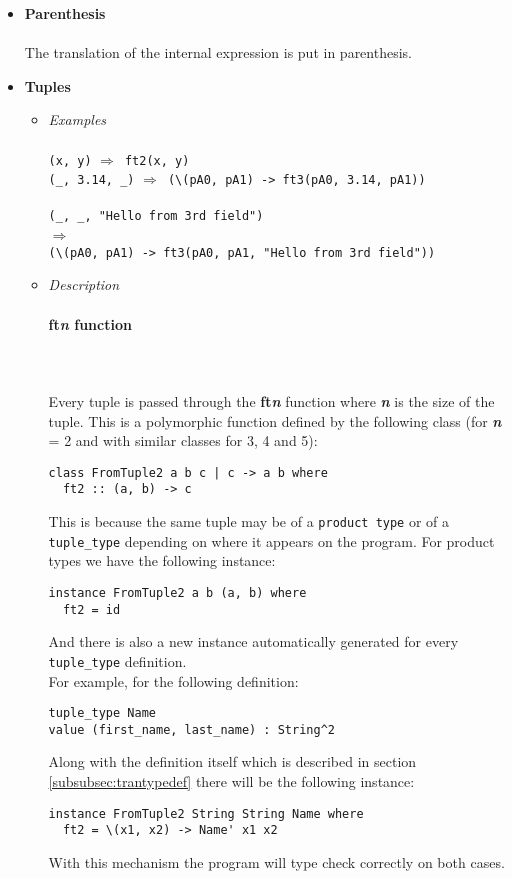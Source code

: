 \documentclass[diploma]{softlab-thesis}
\def\lra{$\Longrightarrow$\ }
\def\pend{\mbox{}\\\\}
\begin{document}
\begin{itemize}
\item
\textbf{Parenthesis}\\\\
The translation of the internal expression is put in parenthesis.\\

\item
\textbf{Tuples}
\begin{itemize}
\item
\textit{Examples}\\\\
\texttt{(x, y)} \lra \texttt{ft2(x, y)} \\
\verb|(_, 3.14, _)| \lra \verb|(\(pA0, pA1) -> ft3(pA0, 3.14, pA1))|\\
\\
\verb|(_, _, "Hello from 3rd field")|
\\
\lra
\\
\verb|(\(pA0, pA1) -> ft3(pA0, pA1, "Hello from 3rd field"))|\\

\newpage
\item
\textit{Description}
\paragraph{ft\textit{n} function}\pend
Every tuple is passed through the \textbf{ft\textit{n}} function where
\textbf{\textit{n}} is the size of the tuple. This is a polymorphic function
defined by the following class (for \textbf{\textit{n}} = 2 and with similar
classes for 3, 4 and 5):
\begin{verbatim}
class FromTuple2 a b c | c -> a b where
  ft2 :: (a, b) -> c
\end{verbatim}
This is because the same tuple may be of a \texttt{product type} or of a
\verb|tuple_type| depending on where it appears on the program.
For product types we have the following instance:
\begin{verbatim}
instance FromTuple2 a b (a, b) where
  ft2 = id
\end{verbatim}
And there is also a new instance automatically generated for every
\verb|tuple_type| definition.\\
For example, for the following definition:
\begin{verbatim}
tuple_type Name
value (first_name, last_name) : String^2
\end{verbatim}
Along with the definition itself which is described in section
\ref{subsubsec:trantypedef} there will be the following instance:
\begin{verbatim}
instance FromTuple2 String String Name where
  ft2 = \(x1, x2) -> Name' x1 x2
\end{verbatim}
With this mechanism the program will type check correctly on both cases.


\end{itemize}
\end{itemize}
\end{document}
